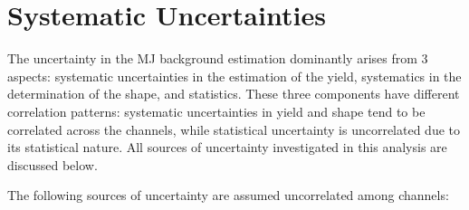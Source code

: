 \section{Systematic Uncertainties}
\label{sec:mj_uncertainty}

The uncertainty in the MJ background estimation dominantly arises from 3 aspects: systematic uncertainties in the estimation of the yield, systematics in the determination of the shape, and statistics.
These three components have different correlation patterns: systematic uncertainties in yield and shape tend to be correlated across the channels, while statistical uncertainty is uncorrelated due to its statistical nature.
All sources of uncertainty investigated in this analysis are discussed below.

The following sources of uncertainty are assumed uncorrelated among channels:

